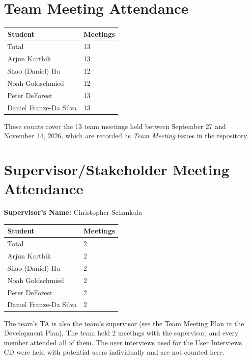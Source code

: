 \documentclass{article}
\begin{document}
\section{Team Meeting Attendance}

\begin{table}[H]
\centering
\begin{tabular}{ll}
\toprule
\textbf{Student} & \textbf{Meetings}\\
\midrule
Total & 13\\
Arjun Karthik & 13\\
Shao (Daniel) Hu & 12\\
Noah Goldschmied & 12\\
Peter DeForest & 13\\
Daniel Franze-Da Silva & 13\\
\bottomrule
\end{tabular}
\end{table}

These counts cover the 13 team meetings held between September 27 and
November 14, 2026, which are recorded as \textit{Team Meeting} issues in the
repository.

\section{Supervisor/Stakeholder Meeting Attendance}

\noindent \textbf{Supervisor's Name: } Christopher Schankula

\begin{table}[H]
\centering
\begin{tabular}{ll}
\toprule
\textbf{Student} & \textbf{Meetings}\\
\midrule
Total & 2\\
Arjun Karthik & 2\\
Shao (Daniel) Hu & 2\\
Noah Goldschmied & 2\\
Peter DeForest & 2\\
Daniel Franze-Da Silva & 2\\
\bottomrule
\end{tabular}
\end{table}

The team's TA is also the team's supervisor (see the Team Meeting Plan in the
Development Plan). The team held 2 meetings with the supervisor, and every
member attended all of them. The user interviews used for the User Interviews
CD were held with potential users individually and are not counted here.
\end{document}
